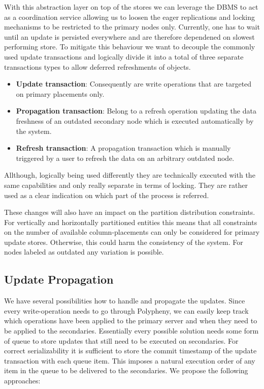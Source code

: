 With this abstraction layer on top of the stores we can leverage the DBMS to act as a coordination service allowing us to loosen the eager replications and 
locking mechanisms to be restricted to the primary nodes only. Currently, one has to wait until an update is persisted everywhere and are therefore
dependened on slowest performing store.
To mitigate this behaviour we want to decouple the commonly used update transactions and logically divide it into a total of three separate transactions types
to allow deferred refreshments of objects.
\begin{itemize}
    \item \textbf{Update transaction}: Consequently are write operations that are targeted on primary placements only.
    \item \textbf{Propagation transaction}: Belong to a refresh operation updating the data freshness of an outdated secondary node which is 
    executed automatically by the system.
    \item \textbf{Refresh transaction}: A propagation transaction which is manually triggered by a user to refresh the data on an arbitrary outdated node.
\end{itemize}

Allthough, logically being used differently they are technically executed with the same capabilities and only really separate in terms of locking.
They are rather used as a clear indication on which part of the process is referred.

These changes will also have an impact on the partition distribution constraints. For vertically and horizontally partitioned 
entities this means that all constraints on the number of available column-placements can only be considered for primary update stores. Otherwise, this could harm
the consistency of the system. For nodes labeled as outdated any variation is possible.

\subsection{Update Propagation}
We have several possibilities how to handle and propagate the updates.
Since every write-operation needs to go through Polypheny, we can easily keep track which operations have been applied to the primary server and when 
they need to be applied to the secondaries. Essentially every possible solution needs some form of queue to store updates that still need to be executed 
on secondaries. For correct serializability it is sufficient to store the commit timestamp of the update transaction with each queue item. This imposes a natural
execution order of any item in the queue to be delivered to the secondaries.
We propose the following approaches: \\

